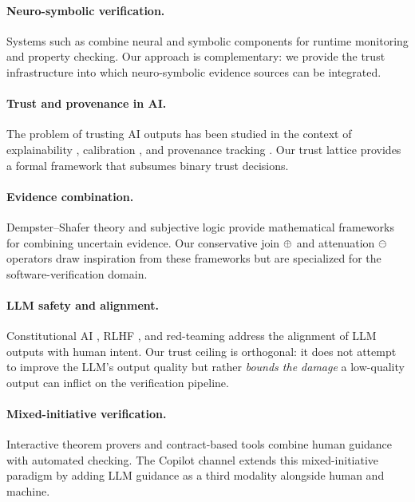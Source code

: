 \documentclass[11pt]{article}
\begin{document}
\paragraph{Neuro-symbolic verification.}
Systems such as \cite{sun2024clover,agrawal2023monitor}
combine neural and symbolic components for runtime
monitoring and property checking.  Our approach is
complementary: we provide the trust infrastructure into
which neuro-symbolic evidence sources can be integrated.

\paragraph{Trust and provenance in AI.}
The problem of trusting AI outputs has been studied in the
context of explainability \cite{ribeiro2016should,
lundberg2017unified}, calibration \cite{guo2017calibration,
desai2020calibration}, and provenance tracking
\cite{buneman2001and,cheney2009provenance}.  Our trust
lattice provides a formal framework that subsumes binary
trust decisions.

\paragraph{Evidence combination.}
Dempster--Shafer theory \cite{shafer1976mathematical,
dempster2008upper} and subjective logic
\cite{josang2016subjective} provide mathematical frameworks
for combining uncertain evidence.  Our conservative join
$\oplus$ and attenuation $\ominus$ operators draw inspiration
from these frameworks but are specialized for the
software-verification domain.

\paragraph{LLM safety and alignment.}
Constitutional AI \cite{bai2022constitutional}, RLHF
\cite{ouyang2022training}, and red-teaming
\cite{perez2022red,ganguli2022red} address the alignment
of LLM outputs with human intent.  Our trust ceiling is
orthogonal: it does not attempt to improve the LLM's
output quality but rather \emph{bounds the damage} a
low-quality output can inflict on the verification pipeline.

\paragraph{Mixed-initiative verification.}
Interactive theorem provers \cite{de2015lean,coq2024manual}
and contract-based tools \cite{barnett2011specification,
leino2010dafny} combine human guidance with automated
checking.  The Copilot channel extends this mixed-initiative
paradigm by adding LLM guidance as a third modality alongside
human and machine.
\end{document}
